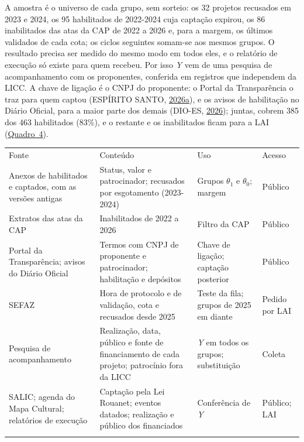 \documentclass[12pt,a4paper]{article}
\begin{document}
A amostra é o universo de cada grupo, sem sorteio: os 32 projetos recusados em 2023 e 2024, os 95
habilitados de 2022-2024 cuja captação expirou, os 86 inabilitados das atas da CAP de 2022 a 2026 e,
para a margem, os últimos validados de cada cota; os ciclos seguintes somam-se aos mesmos grupos. O
resultado precisa ser medido do mesmo modo em todos eles, e o relatório de execução só existe para
quem recebeu. Por isso \emph{Y} vem de uma pesquisa de acompanhamento com os proponentes, conferida
em registros que independem da LICC. A chave de ligação é o CNPJ do proponente: o Portal da
Transparência o traz para quem captou (ESPÍRITO SANTO, \hyperref[ref-espirito-14]{2026a}), e os
avisos de habilitação no Diário Oficial, para a maior parte dos demais (DIO-ES,
\hyperref[ref-dio-es-10]{2026}); juntas, cobrem 385 dos 463 habilitados (83\%), e o restante e os
inabilitados ficam para a LAI (\hyperref[quadro-4]{Quadro~4}).

\begin{table}[!htbp]
\label{quadro-4}
\footnotesize\renewcommand{\arraystretch}{1.15}
\begin{tabular}{@{}>{\raggedright\arraybackslash}p{}>{\raggedright\arraybackslash}p{}>{\raggedright\arraybackslash}p{}>{\raggedright\arraybackslash}p{}@{}}
\multicolumn{4}{@{}p{\linewidth}@{}}{\normalsize\raggedright \textbf{Quadro 4} -- Fontes de dados da avaliação} \\[4pt]
\toprule
Fonte & Conteúdo & Uso & Acesso \\
\midrule
Anexos de habilitados e captados, com as versões antigas & Status, valor e patrocinador; recusados por esgotamento (2023-2024) & Grupos \(\theta_1\) e \(\theta_0\); margem & Público \\ \addlinespace[3pt]
Extratos das atas da CAP & Inabilitados de 2022 a 2026 & Filtro da CAP & Público \\ \addlinespace[3pt]
Portal da Transparência; avisos do Diário Oficial & Termos com CNPJ de proponente e patrocinador; habilitação e depósitos & Chave de ligação; captação posterior & Público \\ \addlinespace[3pt]
SEFAZ & Hora de protocolo e de validação, cota e recusados desde 2025 & Teste da fila; grupos de 2025 em diante & Pedido por LAI \\ \addlinespace[3pt]
Pesquisa de acompanhamento & Realização, data, público e fonte de financiamento de cada projeto; patrocínio fora da LICC & \emph{Y} em todos os grupos; substituição & Coleta \\ \addlinespace[3pt]
SALIC; agenda do Mapa Cultural; relatórios de execução & Captação pela Lei Rouanet; eventos datados; realização e público dos financiados & Conferência de \emph{Y} & Público; LAI \\
\bottomrule
\addlinespace[2pt]
\multicolumn{4}{@{}p{\linewidth}@{}}{\raggedright \textit{Fonte}: elaboração própria.} \\
\end{tabular}
\end{table}
\end{document}
